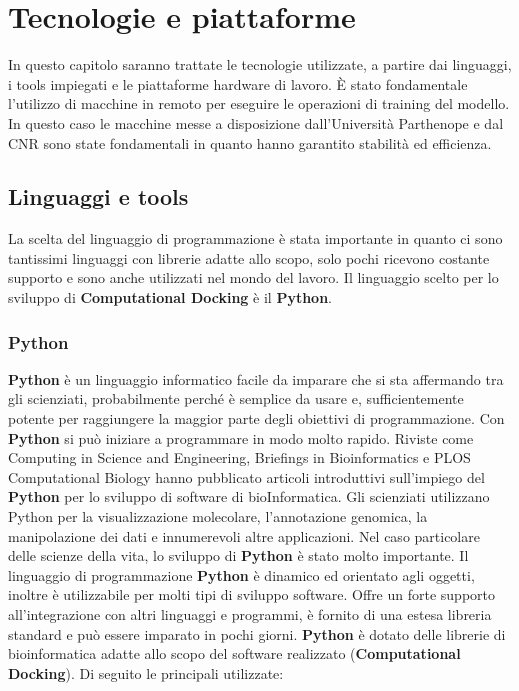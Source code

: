 \chapter{Tecnologie e piattaforme}
In questo capitolo saranno trattate le tecnologie utilizzate, a partire dai linguaggi, i tools impiegati e le piattaforme hardware di lavoro. È stato fondamentale l’utilizzo di macchine in remoto per eseguire le operazioni di training del modello. In questo caso le macchine messe a disposizione dall’Università Parthenope e dal CNR sono state fondamentali in quanto hanno garantito stabilità ed efficienza.

\section{Linguaggi e tools}
La scelta del linguaggio di programmazione è stata importante in quanto ci sono tantissimi linguaggi con librerie adatte allo scopo, solo pochi ricevono costante supporto e sono anche utilizzati nel mondo del lavoro.\newline
Il linguaggio scelto per lo sviluppo di \textbf{Computational Docking} è il \textbf{Python}.

\subsection{Python}
\textbf{Python} è un linguaggio informatico facile da imparare che si sta affermando tra gli scienziati, probabilmente perché è semplice da usare e, sufficientemente potente per raggiungere la maggior parte degli obiettivi di programmazione. Con \textbf{Python} si può iniziare a programmare in modo molto rapido. Riviste come Computing in Science and Engineering, Briefings in Bioinformatics e PLOS Computational Biology hanno pubblicato articoli introduttivi sull'impiego del \textbf{Python} per lo sviluppo di software di bioInformatica. Gli scienziati utilizzano Python per la visualizzazione molecolare, l'annotazione genomica, la manipolazione dei dati e innumerevoli altre applicazioni. Nel caso particolare delle scienze della vita, lo sviluppo di \textbf{Python} è stato molto importante.\cite{bassi2016python}\newline
Il linguaggio di programmazione \textbf{Python} è dinamico ed orientato agli oggetti, inoltre è utilizzabile per molti tipi  di sviluppo software. Offre un forte supporto all'integrazione con altri linguaggi e programmi, è fornito di una estesa libreria standard e può essere imparato in pochi giorni.\newline
\textbf{Python} è dotato delle librerie di bioinformatica adatte allo scopo del software realizzato (\textbf{Computational Docking}). Di seguito le principali utilizzate:

